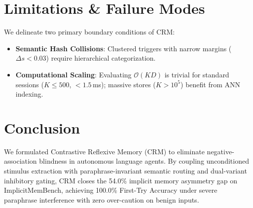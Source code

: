 \documentclass[10pt,conference]{IEEEtran}
\begin{document}
\section{Limitations \& Failure Modes}

We delineate two primary boundary conditions of CRM:
\begin{itemize}
\setlength{\itemsep}{0pt}
\setlength{\parskip}{0pt}
    \item \textbf{Semantic Hash Collisions}: Clustered triggers with narrow margins ($\Delta s < 0.03$) require hierarchical categorization.
    \item \textbf{Computational Scaling}: Evaluating $\mathcal{O}(KD)$ is trivial for standard sessions ($K \le 500$, $<1.5$\,ms); massive stores ($K > 10^5$) benefit from ANN indexing.
\end{itemize}

\section{Conclusion}

We formulated Contrastive Reflexive Memory (CRM) to eliminate negative-association blindness in autonomous language agents. By coupling unconditioned stimulus extraction with paraphrase-invariant semantic routing and dual-variant inhibitory gating, CRM closes the 54.0\% implicit memory asymmetry gap on ImplicitMemBench, achieving 100.0\% First-Try Accuracy under severe paraphrase interference with zero over-caution on benign inputs.
\end{document}
